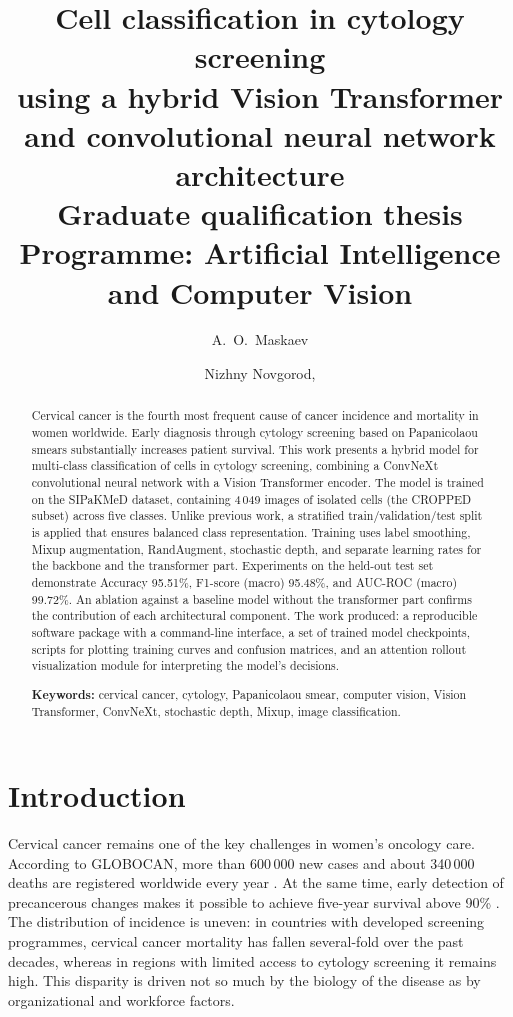 \documentclass[14pt,a4paper]{extreport}
\title{
    \textbf{Cell classification in cytology screening\\
    using a hybrid Vision Transformer\\
    and convolutional neural network architecture}\\[1em]
    \large Graduate qualification thesis\\
    Programme: Artificial Intelligence and Computer Vision
}
\author{A.~O.~Maskaev}
\date{Nizhny Novgorod, \the\year}
\begin{document}
\maketitle
\thispagestyle{empty}
\setcounter{page}{2}

\begin{abstract}
Cervical cancer is the fourth most frequent cause of cancer incidence and
mortality in women worldwide. Early diagnosis through cytology screening
based on Papanicolaou smears substantially increases patient survival.
This work presents a hybrid model for multi-class classification of cells
in cytology screening, combining a ConvNeXt convolutional neural network
with a Vision Transformer encoder. The model is trained on the SIPaKMeD
dataset, containing 4\,049 images of isolated cells (the CROPPED subset)
across five classes. Unlike previous work, a stratified
train/validation/test split is applied that ensures balanced class
representation. Training uses label smoothing, Mixup augmentation,
RandAugment, stochastic depth, and separate learning rates for the
backbone and the transformer part. Experiments on the held-out test set
demonstrate Accuracy 95.51\%, F1-score (macro) 95.48\%, and AUC-ROC
(macro) 99.72\%. An ablation against a baseline model without the
transformer part confirms the contribution of each architectural
component. The work produced: a reproducible software package with a
command-line interface, a set of trained model checkpoints, scripts for
plotting training curves and confusion matrices, and an attention rollout
visualization module for interpreting the model's decisions.

\textbf{Keywords:} cervical cancer, cytology, Papanicolaou smear,
computer vision, Vision Transformer, ConvNeXt, stochastic depth, Mixup,
image classification.
\end{abstract}


\renewcommand{\contentsname}{Contents}
\tableofcontents
\clearpage

\chapter*{Introduction}
\label{ch:intro}

Cervical cancer remains one of the key challenges in women's oncology
care. According to GLOBOCAN, more than 600\,000 new cases and about
340\,000 deaths are registered worldwide every year
\cite{bray2018global}. At the same time, early detection of precancerous
changes makes it possible to achieve five-year survival above 90\%
\cite{curry2018screening}. The distribution of incidence is uneven: in
countries with developed screening programmes, cervical cancer mortality
has fallen several-fold over the past decades, whereas in regions with
limited access to cytology screening it remains high. This disparity is
driven not so much by the biology of the disease as by organizational
and workforce factors.
\end{document}
